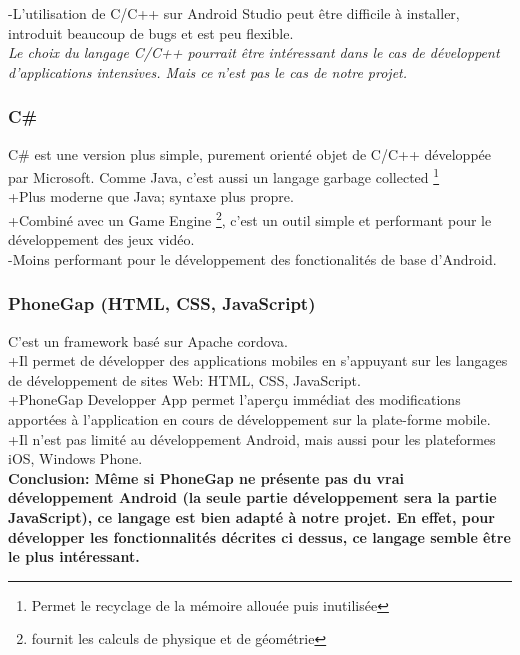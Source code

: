 \documentclass{report}
\begin{document}
-L'utilisation de C/C++ sur Android Studio peut être difficile à installer, introduit beaucoup de bugs et est peu flexible.\\

\textit{ Le choix du langage C/C++ pourrait être intéressant dans le cas de développent d'applications intensives. Mais ce n'est pas le cas de notre projet.}

\subsubsection{C\#}
C\# est une version plus simple, purement orienté objet de C/C++ développée par Microsoft. Comme Java, c'est aussi un langage \og garbage collected \fg \footnote{Permet le recyclage de la mémoire allouée puis inutilisée}\\

+Plus moderne que Java; syntaxe plus propre.\\

+Combiné avec un \og Game Engine \fg \footnote{fournit les calculs de physique et de géométrie }, c'est un outil simple et performant pour le développement des jeux vidéo. \\

-Moins performant pour le développement des fonctionalités de base d'Android.


\subsubsection{PhoneGap (HTML, CSS, JavaScript)}
C'est un framework basé sur Apache cordova.\\

+Il permet de développer des applications mobiles en s'appuyant sur les langages de développement de sites Web: HTML, CSS, JavaScript.\\

+PhoneGap Developper App permet l'aperçu immédiat des modifications apportées à l'application en cours de développement sur la plate-forme mobile.\\

+Il n'est pas limité au développement Android, mais aussi pour les plateformes iOS, Windows Phone.\\


\textbf{Conclusion: Même si PhoneGap ne présente pas du vrai développement Android (la seule partie développement sera la partie JavaScript), ce langage est bien adapté à notre projet. En effet, pour développer les fonctionnalités décrites ci dessus, ce langage semble être le plus intéressant.}
\end{document}
